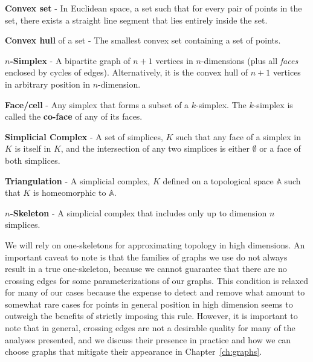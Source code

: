 \begin{defn}
  \textbf{Convex set} - In Euclidean space, a set such that for every pair of points in the set, there exists a straight line segment that lies entirely inside the set.
\end{defn}

\begin{defn}
  \textbf{Convex hull} of a set - The smallest convex set containing a set of points.
\end{defn}

\begin{defn}
  \textbf{$n$-Simplex} - A bipartite graph of $n+1$ vertices in $n$-dimensions (plus all \emph{faces} enclosed by cycles of edges). Alternatively, it is the convex hull of $n+1$ vertices in arbitrary position in $n$-dimension.
\end{defn}

\begin{defn}
  \textbf{Face/cell} - Any simplex that forms a subset of a $k$-simplex.
  The $k$-simplex is called the \textbf{co-face} of any of its faces.
\end{defn}

\begin{defn}
  \textbf{Simplicial Complex} - A set of simplices, $K$ such that any face of
  a simplex in $K$ is itself in $K$, and the intersection of any two simplices
  is either $\emptyset$ or a face of both simplices.
\end{defn}

\begin{defn}
  \textbf{Triangulation} - A simplicial complex, $K$ defined on a topological
  space $\mathbb{A}$ such that $K$ is homeomorphic to $\mathbb{A}$.
\end{defn}

\begin{defn}
  \textbf{$n$-Skeleton} - A simplicial complex that includes only up to dimension
  $n$ simplices.
\end{defn}

We will rely on one-skeletons for approximating topology in high dimensions.
%
An important caveat to note is that the families of graphs we use do not always result in a true one-skeleton, because we cannot guarantee that there are no crossing edges for some parameterizations of our graphs.
%
This condition is relaxed for many of our cases because the expense to detect and remove what amount to somewhat rare cases for points in general position in high dimension seems to outweigh the benefits of strictly imposing this rule.
%
However, it is important to note that in general, crossing edges are not a desirable quality for many of the analyses presented, and we discuss their presence in practice and how we can choose graphs that mitigate their appearance in Chapter~\ref{ch:graphs}.

